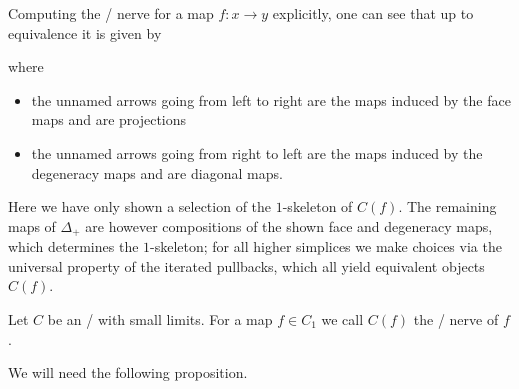 \begin{remark}
    Computing the \Cech/ nerve for a map $f\colon x\to y$ explicitly, one can see that up to equivalence it is given by
    \begin{center}
    \end{center}
    where
    \begin{itemize}
        \item the unnamed arrows going from left to right are the maps induced by the face maps and are projections 
        \item the unnamed arrows going from right to left are the maps induced by the degeneracy maps and are diagonal maps. 
    \end{itemize}
    Here we have only shown a selection of the $1$-skeleton of $C(f)$.
    The remaining maps of $\Delta_+$ are however compositions of the shown face and degeneracy maps, which determines the $1$-skeleton; for all higher simplices we make choices via the universal property of the iterated pullbacks, which all yield equivalent objects $C(f)$. %
\end{remark}
\begin{definition}
    Let $C$ be an \inftycat/ with small limits. 
    For a map $f\in C_1$ we call $C(f)$ the \Cech/ nerve of $f$.
\end{definition}
We will need the following proposition.
